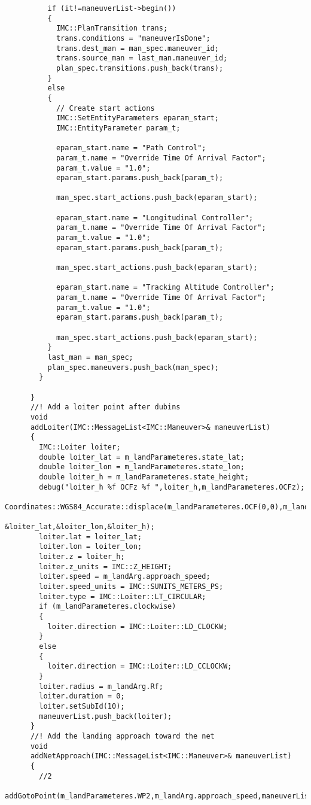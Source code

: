 \begin{frame}[fragile]
\begin{lstlisting}
          if (it!=maneuverList->begin())
          {
            IMC::PlanTransition trans;
            trans.conditions = "maneuverIsDone";
            trans.dest_man = man_spec.maneuver_id;
            trans.source_man = last_man.maneuver_id;
            plan_spec.transitions.push_back(trans);
          }
          else
          {
            // Create start actions
            IMC::SetEntityParameters eparam_start;
            IMC::EntityParameter param_t;

            eparam_start.name = "Path Control";
            param_t.name = "Override Time Of Arrival Factor";
            param_t.value = "1.0";
            eparam_start.params.push_back(param_t);

            man_spec.start_actions.push_back(eparam_start);

            eparam_start.name = "Longitudinal Controller";
            param_t.name = "Override Time Of Arrival Factor";
            param_t.value = "1.0";
            eparam_start.params.push_back(param_t);

            man_spec.start_actions.push_back(eparam_start);

            eparam_start.name = "Tracking Altitude Controller";
            param_t.name = "Override Time Of Arrival Factor";
            param_t.value = "1.0";
            eparam_start.params.push_back(param_t);

            man_spec.start_actions.push_back(eparam_start);
          }
          last_man = man_spec;
          plan_spec.maneuvers.push_back(man_spec);
        }

      }
      //! Add a loiter point after dubins
      void
      addLoiter(IMC::MessageList<IMC::Maneuver>& maneuverList)
      {
        IMC::Loiter loiter;
        double loiter_lat = m_landParameteres.state_lat;
        double loiter_lon = m_landParameteres.state_lon;
        double loiter_h = m_landParameteres.state_height;
        debug("loiter_h %f OCFz %f ",loiter_h,m_landParameteres.OCFz);
        Coordinates::WGS84_Accurate::displace(m_landParameteres.OCF(0,0),m_landParameteres.OCF(1,0),m_landParameteres.OCFz,
                                              &loiter_lat,&loiter_lon,&loiter_h);
        loiter.lat = loiter_lat;
        loiter.lon = loiter_lon;
        loiter.z = loiter_h;
        loiter.z_units = IMC::Z_HEIGHT;
        loiter.speed = m_landArg.approach_speed;
        loiter.speed_units = IMC::SUNITS_METERS_PS;
        loiter.type = IMC::Loiter::LT_CIRCULAR;
        if (m_landParameteres.clockwise)
        {
          loiter.direction = IMC::Loiter::LD_CLOCKW;
        }
        else
        {
          loiter.direction = IMC::Loiter::LD_CCLOCKW;
        }
        loiter.radius = m_landArg.Rf;
        loiter.duration = 0;
        loiter.setSubId(10);
        maneuverList.push_back(loiter);
      }
      //! Add the landing approach toward the net
      void
      addNetApproach(IMC::MessageList<IMC::Maneuver>& maneuverList)
      {
        //2
        addGotoPoint(m_landParameteres.WP2,m_landArg.approach_speed,maneuverList);


\end{lstlisting}
\end{frame}
